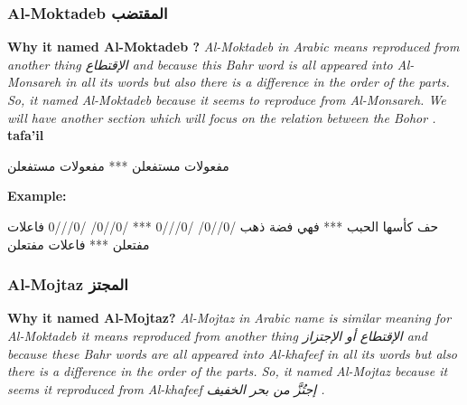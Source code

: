 \subsubsection{Al-Moktadeb \textarabic{المقتضب}}
\textbf{Why it named Al-Moktadeb ?}
\textit{Al-Moktadeb in Arabic means reproduced from another thing \textarabic{الإقتطاع} and because this Bahr word is all appeared into Al-Monsareh in all its words but also there is a difference in the order of the parts. So, it named Al-Moktadeb because it seems to reproduce from Al-Monsareh. We will have another section which will focus on the relation between the Bohor \cite{Alkafi1994}.  %
}\\


\textbf{tafa'il}

\begin{Arabic}
  \begin{traditionalpoem*}

مفعولات مستفعلن *** مفعولات مستفعلن

  \end{traditionalpoem*}
      \end{Arabic}


\textbf{Example:}

\begin{Arabic}
  \begin{traditionalpoem*}

    حف كأسها الحبب *** فهي فضة ذهب
    /0//0/  /0///0 *** /0//0/  /0///0
    فاعلات  مفتعلن *** فاعلات مفتعلن




	\end{traditionalpoem*}
      \end{Arabic}



      

      \subsubsection{Al-Mojtaz \textarabic{المجتز}}
\textbf{Why it named Al-Mojtaz?}
\textit{Al-Mojtaz in Arabic name is similar meaning for Al-Moktadeb it means reproduced from another thing \textarabic{الإقتطاع أو الإجتزاز} and because these Bahr words are all appeared into Al-khafeef in all its words but also there is a difference in the order of the parts. So, it named Al-Mojtaz because it seems it reproduced from Al-khafeef \textarabic{إجتُزَّ من بحر الخفيف} \cite{Alkafi1994}.}\\


